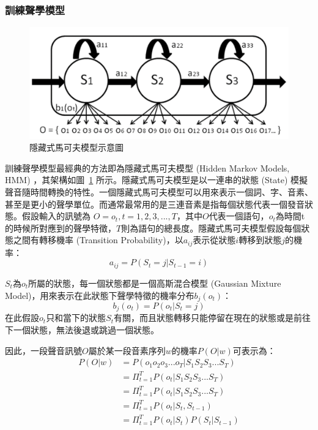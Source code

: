 \subsubsection{訓練聲學模型}
\begin{figure}
\centering
\includegraphics[scale=0.5]{images/chap2_hmm.png}
\caption{隱藏式馬可夫模型示意圖} \label{fig:chap2_hmm}
\end{figure}
訓練聲學模型最經典的方法即為隱藏式馬可夫模型 (Hidden Markov Models, HMM) ，其架構如圖~\ref{fig:chap2_hmm}  所示。隱藏式馬可夫模型是以一連串的狀態 (State) 模擬聲音隨時間轉換的特性。一個隱藏式馬可夫模型可以用來表示一個詞、字、音素、甚至是更小的聲學單位。而通常最常用的是三連音素是指每個狀態代表一個發音狀態。假設輸入的訊號為 $O = {o_t, t = 1, 2, 3, ...,
T}$，其中$O$代表一個語句，$o_t$為時間t的時候所對應到的聲學特徵，$T$則為語句的總長度。隱藏式馬可夫模型假設每個狀態之間有轉移機率 (Transition Probability)，以$a_{ij}$表示從狀態$i$轉移到狀態$j$的機率：
    \begin{equation}
       a_{ij} = P(S_t = j | S_{t-1} = i)
    \end{equation}

$S_t$為$o_t$所屬的狀態，每一個狀態都是一個高斯混合模型 (Gaussian Mixture Model)，用來表示在此狀態下聲學特徵的機率分布$b_j(o_t)$：
    \begin{equation}
    b_j(o_t) = P(o_t|S_t = j)
    \end{equation}
在此假設$o_t$只和當下的狀態$S_t$有關，而且狀態轉移只能停留在現在的狀態或是前往下一個狀態，無法後退或跳過一個狀態。

因此，一段聲音訊號$O$屬於某一段音素序列$w$的機率$P(O|w)$可表示為：
    \begin{equation}
    \begin{split}
       P(O|w) &= P(o_1o_2o_3...o_T | S_1S_2S_3...S_T) \\
              &= \Pi^T_{t=1}P(o_t|S_1S_2S_3...S_T) \\
              &= \Pi^T_{t=1}P(o_t|S_1S_2S_3...S_T) \\
              &= \Pi^T_{t=1}P(o_t|S_t, S_{t-1}) \\
              &= \Pi^T_{t=1}P(o_t|S_t)P(S_t|S_{t-1}) 
    \end{split}
    \end{equation}

